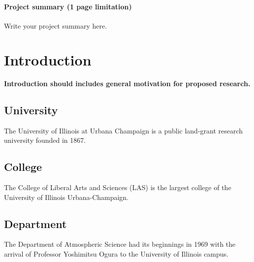\documentclass[11pt]{article} %
\begin{document}
\noindent \textbf{\Huge Project summary \textbf{\color{red} (1 page limitation)}} \\
\\
Write your project summary here.  \par

\newpage
\renewcommand{\contentsname}{\Huge\textbf{Contents}\textbf{\color{red} (1 page limitation)}\\}
\renewcommand{\cfttoctitlefont}{\Huge\textbf}
\renewcommand{\cftaftertoctitle}{\hfill}
\renewcommand{\cftsecfont}{\normalsize}
\renewcommand{\cftsubsecfont}{\normalsize}
\renewcommand{\cftsubsubsecfont}{\normalsize}
\renewcommand{\cftsecpagefont}{\normalsize\bfseries}
\renewcommand{\cftsubsecpagefont}{\normalsize\bfseries}
\renewcommand{\cftsubsubsecpagefont}{\normalsize\bfseries}
\renewcommand\thesection{\Roman{section}}
\renewcommand\thesubsection{\Roman{section}.\Alph{subsection}}
\renewcommand\thesubsubsection{\Roman{section}.\Alph{subsection}.\arabic{subsubsection}}
\tableofcontents
\thispagestyle{fancy}

\newpage
\linenumbers
\section{Introduction}
\textbf{\color{red} Introduction should includes general motivation for proposed research.}
\subsection{University}
The University of Illinois at Urbana Champaign is a public land-grant research university founded in 1867. \par

\subsection{College}
The College of Liberal Arts and Sciences (LAS) is the largest college of the University of Illinois Urbana-Champaign.

\subsection{Department}
The Department of Atmospheric Science had its beginnings in 1969 with the arrival of Professor Yoshimitsu Ogura to the University of Illinois campus. 
\end{document}
